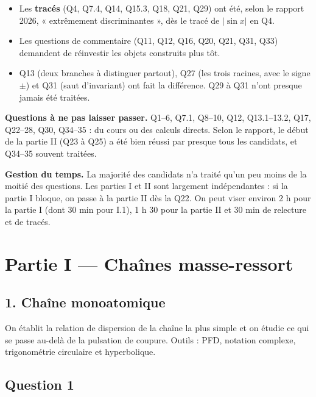 \documentclass[11pt,a4paper]{article}
\providecommand{\tightlist}{\setlength{\itemsep}{0pt}\setlength{\parskip}{0pt}}
\begin{document}
\begin{itemize}
\tightlist
\item
  Les \textbf{tracés} (Q4, Q7.4, Q14, Q15.3, Q18, Q21, Q29) ont été, selon le rapport 2026, « extrêmement discriminantes », dès le tracé de \(\lvert\sin x\rvert\) en Q4.
\item
  Les questions de commentaire (Q11, Q12, Q16, Q20, Q21, Q31, Q33) demandent de réinvestir les objets construits plus tôt.
\item
  Q13 (deux branches à distinguer partout), Q27 (les trois racines, avec le signe \(\pm\)) et Q31 (saut d'invariant) ont fait la différence. Q29 à Q31 n'ont presque jamais été traitées.
\end{itemize}

\textbf{Questions à ne pas laisser passer.} Q1--6, Q7.1, Q8--10, Q12, Q13.1--13.2, Q17, Q22--28, Q30, Q34--35 : du cours ou des calculs directs. Selon le rapport, le début de la partie II (Q23 à Q25) a été bien réussi par presque tous les candidats, et Q34--35 souvent traitées.

\textbf{Gestion du temps.} La majorité des candidats n'a traité qu'un peu moins de la moitié des questions. Les parties I et II sont largement indépendantes : si la partie I bloque, on passe à la partie II dès la Q22. On peut viser environ 2 h pour la partie I (dont 30 min pour I.1), 1 h 30 pour la partie II et 30 min de relecture et de tracés.

\hypertarget{partie-i-chauxeenes-masse-ressort}{%
\section{Partie I --- Chaînes masse-ressort}\label{partie-i-chauxeenes-masse-ressort}}

\hypertarget{chauxeene-monoatomique}{%
\subsection{1. Chaîne monoatomique}\label{chauxeene-monoatomique}}

On établit la relation de dispersion de la chaîne la plus simple et on étudie ce qui se passe au-delà de la pulsation de coupure. Outils : PFD, notation complexe, trigonométrie circulaire et hyperbolique.

\hypertarget{question-1}{%
\subsection{Question 1}\label{question-1}}
\end{document}
